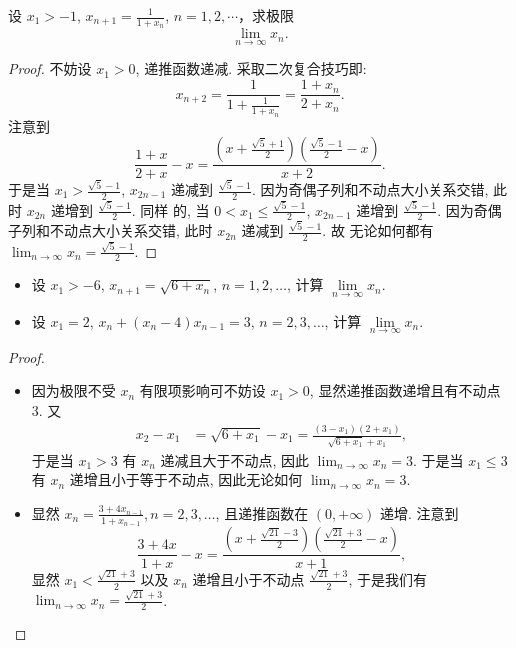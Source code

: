 \documentclass[lang=cn,10pt,thmcnt=section]{elegantbook}
\begin{document}
\begin{example}
	设 $x_1 > -1$, $x_{n+1} = \frac{1}{1+x_n}$, $n = 1, 2, \cdots$，求极限
\[
\lim_{n \to \infty} x_n.
\]
\end{example}
\begin{proof}
	不妨设 $x_1 > 0$, 递推函数递减. 采取二次复合技巧即:
$$ x_{n+2} = \frac{1}{1 + \frac{1}{1+x_n}} = \frac{1+x_n}{2+x_n}. $$
注意到
$$ \frac{1+x}{2+x} - x = \frac{\left(x + \frac{\sqrt{5}+1}{2}\right)\left(\frac{\sqrt{5}-1}{2} - x\right)}{x+2}. $$
于是当 $x_1 > \frac{\sqrt{5}-1}{2}$, $x_{2n-1}$ 递减到 $\frac{\sqrt{5}-1}{2}$. 因为奇偶子列和不动点大小关系交错, 此时 $x_{2n}$ 递增到 $\frac{\sqrt{5}-1}{2}$. 同样 的, 当 $0 < x_1 \le \frac{\sqrt{5}-1}{2}$, $x_{2n-1}$ 递增到 $\frac{\sqrt{5}-1}{2}$. 因为奇偶子列和不动点大小关系交错, 此时 $x_{2n}$ 递减到 $\frac{\sqrt{5}-1}{2}$. 故 无论如何都有 $\lim_{n \to \infty} x_n = \frac{\sqrt{5}-1}{2}$.

\end{proof}

\begin{example}
	\begin{itemize}
		\item 设 $x_1 > -6$, $x_{n+1} = \sqrt{6 + x_n}$, $n = 1, 2, \ldots$, 计算 $\lim\limits_{n \to \infty} x_n$.
		
		\item 设 $x_1 = 2$, $x_n + (x_n - 4)x_{n-1} = 3$, $n = 2, 3, \ldots$, 计算 $\lim\limits_{n \to \infty} x_n$.
	\end{itemize}
\end{example}
\begin{proof}
	\begin{itemize}
		\item 因为极限不受 $x_n$ 有限项影响可不妨设 $x_1 > 0$, 显然递推函数递增且有不动点 3. 又
		\begin{align*}
		x_2 - x_1 &= \sqrt{6+x_1} - x_1 = \frac{(3-x_1)(2+x_1)}{\sqrt{6+x_1}+x_1},
		\end{align*}
		于是当 $x_1 > 3$ 有 $x_n$ 递减且大于不动点, 因此 $\lim_{n \to \infty} x_n = 3$. 于是当 $x_1 \le 3$ 有 $x_n$ 递增且小于等于不动点, 因此无论如何 $\lim_{n \to \infty} x_n = 3$.
		\item 显然 $x_n = \frac{3+4x_{n-1}}{1+x_{n-1}}, n=2, 3, \dots$, 且递推函数在 $(0, +\infty)$ 递增. 注意到
		$$ \frac{3+4x}{1+x} - x = \frac{\left(x + \frac{\sqrt{21}-3}{2}\right)\left(\frac{\sqrt{21}+3}{2} - x\right)}{x+1}, $$
		显然 $x_1 < \frac{\sqrt{21}+3}{2}$ 以及 $x_n$ 递增且小于不动点 $\frac{\sqrt{21}+3}{2}$, 于是我们有 $\lim_{n\to\infty} x_n = \frac{\sqrt{21}+3}{2}$.
		
	\end{itemize}
\end{proof}
\end{document}
